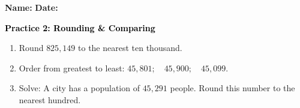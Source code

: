 \documentclass[12pt, letterpaper, fleqn]{article}
\begin{document}
\textbf{Name:} \underline{\hspace{5cm}}
\hfill
\textbf{Date:} \underline{\hspace{3cm}}\\

\begin{tcolorbox}[colback=customteal!20]
    \large\textcolor{black}{\textbf{Practice 2: Rounding & Comparing}}
\end{tcolorbox}
\begin{enumerate}[itemsep=3.5cm, leftmargin=0.6cm]
\item Round $825,149$ to the nearest ten thousand.
\vspace{3cm}
\item Order from greatest to least: $45,801; \quad 45,900; \quad 45,099$.
\vspace{3cm}
\item Solve: A city has a population of $45,291$ people. Round this number to the nearest hundred.
\end{enumerate}
\end{document}
